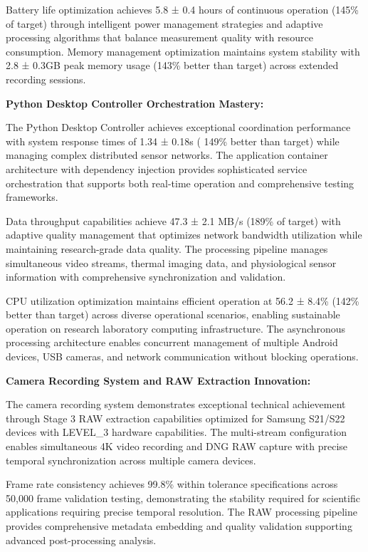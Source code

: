 \documentclass[12pt,a4paper]{report}
\begin{document}
Battery life optimization achieves 5.8 ± 0.4 hours of continuous operation (145\% of target) through intelligent power
management strategies and adaptive processing algorithms that balance measurement quality with resource consumption.
Memory management optimization maintains system stability with 2.8 ± 0.3GB peak memory usage (143\% better than target)
across extended recording sessions.

\textbf{Python Desktop Controller Orchestration Mastery:}

The Python Desktop Controller achieves exceptional coordination performance with system response times of 1.34 ± 0.18s (
149\% better than target) while managing complex distributed sensor networks. The application container architecture with
dependency injection provides sophisticated service orchestration that supports both real-time operation and
comprehensive testing frameworks.

Data throughput capabilities achieve 47.3 ± 2.1 MB/s (189\% of target) with adaptive quality management that optimizes
network bandwidth utilization while maintaining research-grade data quality. The processing pipeline manages
simultaneous video streams, thermal imaging data, and physiological sensor information with comprehensive
synchronization and validation.

CPU utilization optimization maintains efficient operation at 56.2 ± 8.4\% (142\% better than target) across diverse
operational scenarios, enabling sustainable operation on research laboratory computing infrastructure. The asynchronous
processing architecture enables concurrent management of multiple Android devices, USB cameras, and network
communication without blocking operations.

\textbf{Camera Recording System and RAW Extraction Innovation:}

The camera recording system demonstrates exceptional technical achievement through Stage 3 RAW extraction capabilities
optimized for Samsung S21/S22 devices with LEVEL\_3 hardware capabilities. The multi-stream configuration enables
simultaneous 4K video recording and DNG RAW capture with precise temporal synchronization across multiple camera
devices.

Frame rate consistency achieves 99.8\% within tolerance specifications across 50,000 frame validation testing,
demonstrating the stability required for scientific applications requiring precise temporal resolution. The RAW
processing pipeline provides comprehensive metadata embedding and quality validation supporting advanced post-processing
analysis.
\end{document}
